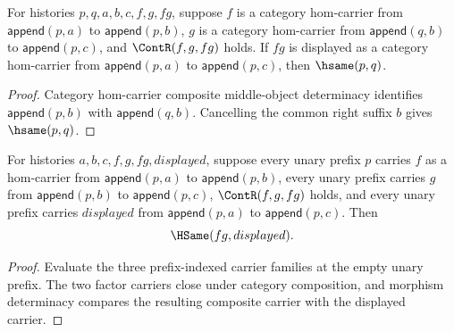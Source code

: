 \begin{theorem}
\label{thm:functor-prefix-hom-carrier-comp-middle-prefix-deterministic}
For histories $p,q,a,b,c,f,g,fg$, suppose $f$ is a category hom-carrier from
$\mathsf{append}(p,a)$ to $\mathsf{append}(p,b)$, $g$ is a category
hom-carrier from $\mathsf{append}(q,b)$ to $\mathsf{append}(p,c)$, and
$\ContR(f,g,fg)$ holds. If $fg$ is displayed as a category hom-carrier from
$\mathsf{append}(p,a)$ to $\mathsf{append}(p,c)$, then $\hsame(p,q)$.
\end{theorem}
\begin{proof}
Category hom-carrier composite middle-object determinacy identifies
$\mathsf{append}(p,b)$ with $\mathsf{append}(q,b)$. Cancelling the common right
suffix $b$ gives $\hsame(p,q)$.
\end{proof}

\begin{theorem}
\label{thm:functor-prefix-hom-carrier-comp-family-public-readback}
For histories $a,b,c,f,g,fg,displayed$, suppose every unary prefix $p$ carries
$f$ as a hom-carrier from $\mathsf{append}(p,a)$ to $\mathsf{append}(p,b)$,
every unary prefix carries $g$ from $\mathsf{append}(p,b)$ to
$\mathsf{append}(p,c)$, $\ContR(f,g,fg)$ holds, and every unary prefix carries
$displayed$ from $\mathsf{append}(p,a)$ to $\mathsf{append}(p,c)$. Then
$$
\HSame(fg,displayed).
$$
\end{theorem}
\begin{proof}
Evaluate the three prefix-indexed carrier families at the empty unary prefix.
The two factor carriers close under category composition, and morphism
determinacy compares the resulting composite carrier with the displayed carrier.
\end{proof}

